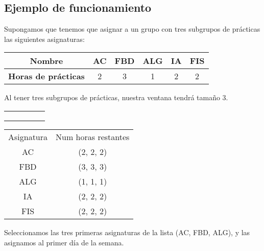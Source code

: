 \subsection{Ejemplo de funcionamiento}
Supongamos que tenemos que asignar a un grupo con tres subgrupos de prácticas las siguientes asignaturas:

\begin{tabular}{c | c  c  c  c  c}
\textbf{Nombre} & AC & FBD & ALG & IA & FIS \\
\hline
\textbf{Horas de prácticas}  & 2 & 3 & 1 & 2 & 2 \\
\end{tabular}

Al tener tres subgrupos de prácticas, nuestra ventana tendrá tamaño 3. 

\begin{minipage}{0.5\textwidth}    
\begin{tabular}{| c | c | c | c | c |}
\hline
 &  &  &  & \\
 \hline
 &  &  &  & \\
 \hline
 &  &  &  & \\
 \hline
 &  &  &  & \\
 \hline 
\end{tabular}
\end{minipage}
\begin{minipage}{0.5\textwidth}
\begin{tabular}{c | c}
Asignatura & Num horas restantes \\
AC & (2, 2, 2) \\
FBD & (3, 3, 3) \\
ALG & (1, 1, 1) \\
IA & (2, 2, 2) \\
FIS & (2, 2, 2)
\end{tabular}
\end{minipage}

Seleccionamos las tres primeras asignaturas de la lista (AC, FBD, ALG), y las asignamos al primer día de la semana.

